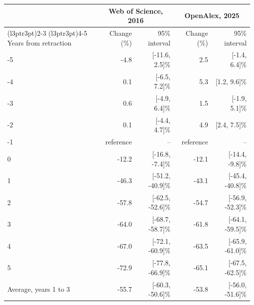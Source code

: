 
\begin{tabular}[t]{lrrrr}
\toprule
\multicolumn{1}{c}{ } & \multicolumn{2}{c}{Web of Science, 2016} & \multicolumn{2}{c}{OpenAlex, 2025} \\
\cmidrule(l{3pt}r{3pt}){2-3} \cmidrule(l{3pt}r{3pt}){4-5}
Years from retraction & Change (\%) & 95\% interval & Change (\%)  & 95\% interval \\
\midrule
-5 & -4.8 & {}[-11.6, 2.5]\% & 2.5 & {}[-1.4, 6.4]\%\\
-4 & 0.1 & {}[-6.5, 7.2]\% & 5.3 & {}[1.2, 9.6]\%\\
-3 & 0.6 & {}[-4.9, 6.4]\% & 1.5 & {}[-1.9, 5.1]\%\\
-2 & 0.1 & {}[-4.4, 4.7]\% & 4.9 & {}[2.4, 7.5]\%\\
-1 & reference & -- & reference & --\\
0 & -12.2 & {}[-16.8, -7.4]\% & -12.1 & {}[-14.4, -9.8]\%\\
1 & -46.3 & {}[-51.2, -40.9]\% & -43.1 & {}[-45.4, -40.8]\%\\
2 & -57.8 & {}[-62.5, -52.6]\% & -54.7 & {}[-56.9, -52.3]\%\\
3 & -64.0 & {}[-68.7, -58.7]\% & -61.8 & {}[-64.1, -59.5]\%\\
4 & -67.0 & {}[-72.1, -60.9]\% & -63.5 & {}[-65.9, -61.0]\%\\
5 & -72.9 & {}[-77.8, -66.9]\% & -65.1 & {}[-67.5, -62.5]\%\\
Average, years 1 to 3 & -55.7 & {}[-60.3, -50.6]\% & -53.8 & {}[-56.0, -51.6]\%\\
\bottomrule
\end{tabular}

